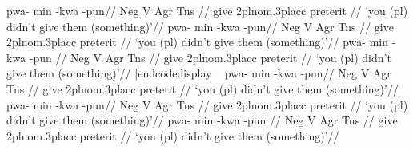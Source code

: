 
\vfil\eject
{}


\codedisplay
\pex[interpartskip=3ex]
\a
\begingl
\gla pwa- min -kwa -pun//
\glb Neg V Agr Tns //
\glc {} give 2pl{\sc nom}.3pl{\sc acc} preterit //
\glft `you (pl) didn't give them (something)'//
\endgl
\a
\begingl[everygl=\openup.5ex,everygla=,everyglb=,
   everyglft=\it,aboveglftskip=1.5ex]
\gla pwa- min -kwa -pun//
\glb Neg V Agr Tns //
\glc {} give 2pl{\sc nom}.3pl{\sc acc} preterit //
\glft `you (pl) didn't give them (something)'//
\endgl
\a
\begingl[everygl=,everygla=\bf,everyglb=\it,
   everyglft=,aboveglftskip=0pt]
\gla pwa- min -kwa -pun //
\glb Neg V Agr Tns //
\glc {} give 2pl{\sc nom}.3pl{\sc acc} preterit //
\glft `you (pl) didn't give them (something)'//
\endgl
\xe
|endcodedisplay
\framedisplay~
\pex[interpartskip=3ex]
\a
\begingl
\gla pwa- min -kwa -pun//
\glb Neg V Agr Tns //
\glc {} give 2pl{\sc nom}.3pl{\sc acc} preterit //
\glft `you (pl) didn't give them (something)'//
\endgl
\a
\begingl[everygl=\openup.5ex,everygla=,everyglb=,
   everyglft=\it,aboveglftskip=1.5ex]
\gla pwa- min -kwa -pun//
\glb Neg V Agr Tns //
\glc {} give 2pl{\sc nom}.3pl{\sc acc} preterit //
\glft `you (pl) didn't give them (something)'//
\endgl
\a
\begingl[everygl=,everygla=\bf,everyglb=\it,
   everyglft=,aboveglftskip=0pt]
\gla pwa- min -kwa -pun //
\glb Neg V Agr Tns //
\glc {} give 2pl{\sc nom}.3pl{\sc acc} preterit //
\glft `you (pl) didn't give them (something)'//
\endgl
\xe
\endframedisplay


